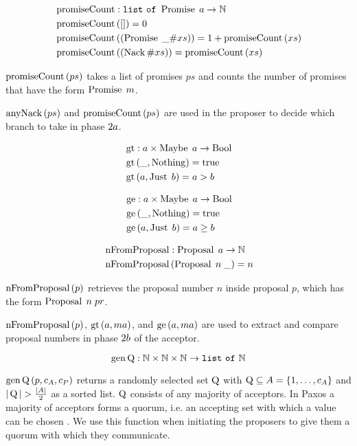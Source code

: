 \begin{align*}
&\operatorname{promiseCount} : \mathtt{list\ of\ } \operatorname{Promise}\; a \to \mathbb{N}\\
&\operatorname{promiseCount}\left(\mathtt{[]}\right) = 0\\
&\operatorname{promiseCount}\left(\left(\operatorname{Promise}\; \mathtt{\_} \mathtt{\#} xs\right)\right) = 1 + \operatorname{promiseCount}\left(xs\right)\\
&\operatorname{promiseCount}\left(\left(\operatorname{Nack} \mathtt{\#} xs\right)\right) = \operatorname{promiseCount}\left(xs\right)
\end{align*}

$\operatorname{promiseCount}\left(ps\right)$ takes a list of promises $ps$ and counts the number of promises that have the form $\operatorname{Promise}\; m$.

$\operatorname{anyNack}\left(ps\right)$ and $\operatorname{promiseCount}\left(ps\right)$ are used in the proposer to decide which branch to take in phase $2a$.

\begin{align*}    
&\operatorname{gt} : a \times \operatorname{Maybe}\; a \to \operatorname{Bool}\\
&\operatorname{gt}\left(\mathtt{\_}, \operatorname{Nothing}\right) = \operatorname{true}\\
&\operatorname{gt}\left(a, \operatorname{Just}\; b\right) = a > b
\end{align*}

\begin{align*}
&\operatorname{ge} : a \times \operatorname{Maybe}\; a \to \operatorname{Bool}\\
&\operatorname{ge}\left(\mathtt{\_}, \operatorname{Nothing}\right) = \operatorname{true}\\
&\operatorname{ge}\left(a, \operatorname{Just}\; b\right) = a \ge b
\end{align*}

\begin{align*}    
&\operatorname{nFromProposal} : \operatorname{Proposal}\; a \to \mathbb{N}\\
&\operatorname{nFromProposal}\left(\operatorname{Proposal}\; n\; \mathtt{\_} \right) = n
\end{align*}

$\operatorname{nFromProposal}\left(p \right)$ retrieves the proposal number $n$ inside proposal $p$, which has the form $\operatorname{Proposal}\; n\; pr$.

$\operatorname{nFromProposal}\left(p \right)$, $\operatorname{gt}\left(a, ma\right)$, and $\operatorname{ge}\left(a, ma\right)$ are used to extract and compare proposal numbers in phase $2b$ of the acceptor.

\[\operatorname{gen\operatorname{Q}} : \mathbb{N} \times \mathbb{N} \times \mathbb{N} \to \mathtt{list\ of\ } \mathbb{N}\]

$\operatorname{gen\operatorname{Q}}\left(p, c_A, c_P\right)$ returns a randomly selected set $\operatorname{Q}$ with $\operatorname{Q} \subseteq A = \left\{1, \dots, c_A\right\}$ and $|\operatorname{Q}| > \frac{|A|}{2}$ as a sorted list.
$\operatorname{Q}$ consists of any majority of acceptors.
In Paxos a majority of acceptors forms a quorum, i.e. an accepting set with which a value can be chosen \cite{Lamport06}.
We use this function when initiating the proposers to give them a quorum with which they communicate.

